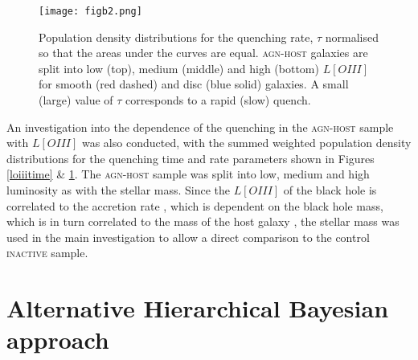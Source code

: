 \documentclass[useAMS,usenatbib]{mn2e}
\def\secondchange    {\color{srv} }
\begin{document}
\begin{figure}
\texttt{[image: figb2.png]}
\caption{{\secondchange Population density} distributions for the quenching rate, $\tau$ normalised so that the areas under the curves are equal. \textsc{agn-host} galaxies are split into low (top), medium (middle) and high (bottom) $L[OIII]$ for smooth (red dashed) and disc (blue solid) galaxies. A small (large) value of $\tau$ corresponds to a rapid (slow) quench.}
\label{loiiirate}
\end{figure}

An investigation into the dependence of the quenching in the \textsc{agn-host} sample with $L[OIII]$ was also conducted, with the summed weighted {\secondchange population density} distributions for the quenching time and rate parameters shown in Figures \ref{loiiitime} \& \ref{loiiirate}. The \textsc{agn-host} sample was split into low, medium and high luminosity as with the stellar mass. Since the  $L[OIII]$ of the black hole is correlated to the accretion rate \citep{Kauff03b}, which is dependent on the black hole mass, which is in turn correlated to the mass of the host galaxy \citep{Mag98}, the stellar mass was used in the main investigation to allow a direct comparison to the control \textsc{inactive} sample. 


\section{Alternative Hierarchical Bayesian approach}\label{althyper}
\end{document}
